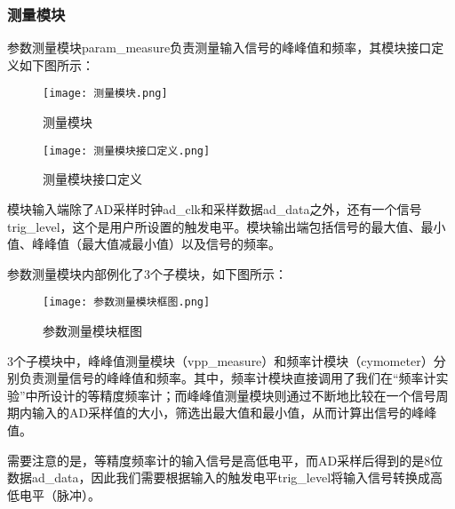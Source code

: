 \documentclass[lang=cn,a4paper,newtx]{elegantpaper}
\begin{document}
\subsubsection{测量模块}
参数测量模块param\_measure负责测量输入信号的峰峰值和频率，其模块接口定义如下图所示： 
\begin{figure}[ht]
	\begin{minipage}[t]{0.48\textwidth}
		\centering
		\texttt{[image: 测量模块.png]}
		\caption{测量模块}
		\label{fig:image1}
	\end{minipage}
	\hfill %
	\begin{minipage}[t]{0.48\textwidth}
		\centering
		\texttt{[image: 测量模块接口定义.png]}
		\caption{测量模块接口定义}
		\label{fig:image2}
	\end{minipage}
\end{figure}
模块输入端除了AD采样时钟ad\_clk和采样数据ad\_data之外，还有一个信号trig\_level，这个是用户所设置的触发电平。模块输出端包括信号的最大值、最小值、峰峰值（最大值减最小值）以及信号的频率。

参数测量模块内部例化了3个子模块，如下图所示： 
  \begin{figure}[!htb]
	\centering
	\caption{参数测量模块框图}
	\label{参数测量模块框图}
	\texttt{[image: 参数测量模块框图.png]}
\end{figure}

3个子模块中，峰峰值测量模块（vpp\_measure）和频率计模块（cymometer）分别负责测量信号的峰峰值和频率。其中，频率计模块直接调用了我们在“频率计实验”中所设计的等精度频率计；而峰峰值测量模块则通过不断地比较在一个信号周期内输入的AD采样值的大小，筛选出最大值和最小值，从而计算出信号的峰峰值。

需要注意的是，等精度频率计的输入信号是高低电平，而AD采样后得到的是8位数据ad\_data，因此我们需要根据输入的触发电平trig\_level将输入信号转换成高低电平（脉冲）。
\end{document}
